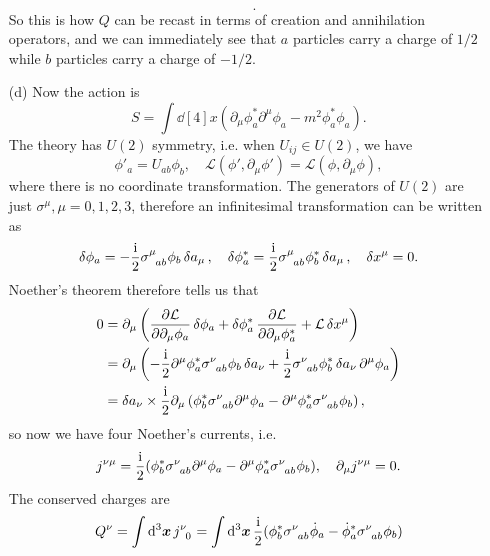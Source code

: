 \documentclass[hyperref, a4paper]{article}
\newcommand*{\ii}{\mathrm{i}}
\begin{document}
\begin{itemize}
\begin{equation}
\begin{aligned}
        \end{aligned}.
    \end{equation}
    So this is how $Q$ can be recast in terms of creation and annihilation operators, and we can immediately see that $a$ particles carry a charge of $1/2$ while $b$ particles carry a charge of $-1/2$.
    \item[(d)] Now the action is 
    \begin{equation}
        S = \int \dd[4]{x} (\partial_\mu \phi^*_a \partial^\mu \phi_a - m^2 \phi^*_a \phi_a).
    \end{equation} 
    The theory has $U(2)$ symmetry, i.e. when $U_{ij} \in U(2)$, we have 
    \[
        \phi'_a = U_{ab} \phi_b, \quad \mathcal{L}(\phi', \partial_\mu \phi') = \mathcal{L}(\phi, \partial_\mu \phi),
    \]
    where there is no coordinate transformation.
    The generators of $U(2)$ are just $\sigma^\mu, \mu = 0, 1, 2, 3$, therefore an infinitesimal transformation can be written as 
    \[
        \var{\phi_a} = - \frac{\ii}{2} \sigma\indices{^\mu_{ab}} \phi_b \var{a_\mu}, \quad \var{\phi^*_a} = \frac{\ii}{2} \sigma\indices{^\mu_{ab}} \phi^*_b \var{a_\mu}, \quad \var{x^\mu} = 0.
    \]
    Noether's theorem therefore tells us that 
    \[
        \begin{aligned}
            0 &= \partial_\mu \left( \pdv{\mathcal{L}}{\partial_\mu \phi_a} \var{\phi_a} + \var{\phi^*_a} \pdv{\mathcal{L}}{\partial_\mu \phi^*_a} + \mathcal{L} \var{x^\mu} \right) \\
            &= \partial_\mu \left( - \frac{\ii}{2} \partial^\mu \phi_a^* \sigma\indices{^\nu_{ab}} \phi_b \var{a_\nu} + \frac{\ii}{2} \sigma\indices{^\nu_{ab}} \phi^*_b \var{a_\nu}\partial^\mu \phi_a \right) \\
            &= \var{a_\nu} \times \frac{\ii}{2} \partial_\mu \left( \phi^*_b \sigma\indices{^\nu_{ab}} \partial^\mu \phi_a - \partial^\mu \phi_a^* \sigma\indices{^\nu_{ab}} \phi_b \right),
        \end{aligned}
    \]
    so now we have four Noether's currents, i.e.
    \begin{equation}
        j\indices{^\nu^\mu} = \frac{\ii}{2} (\phi^*_b \sigma\indices{^\nu_{ab}} \partial^\mu \phi_a - \partial^\mu \phi_a^* \sigma\indices{^\nu_{ab}} \phi_b), \quad \partial_\mu j\indices{^\nu^\mu} = 0.
    \end{equation}
    The conserved charges are 
    \begin{equation}
        \begin{aligned}
            Q^\nu &= \int \dd[3]{\vb*{x}} j\indices{^\nu_0} = \int \dd[3]{\vb*{x}} \frac{\ii}{2} (\phi_b^* \sigma\indices{^\nu_{ab}} \dot{\phi}_a - \dot{\phi}^*_a \sigma\indices{^\nu_{ab}} \phi_b) \\

\end{aligned}
\end{equation}
\end{itemize}
\end{document}
